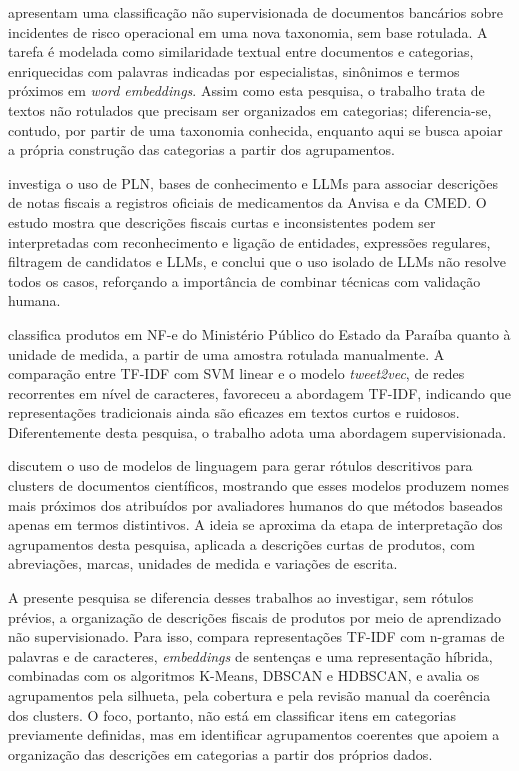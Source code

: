 \documentclass[english,brazilian]{UNISINOSmonografia}
\begin{document}
\cite{hajyahia2019unsupervised} apresentam uma classificação não supervisionada de documentos bancários sobre incidentes de risco operacional em uma nova taxonomia, sem base rotulada. A tarefa é modelada como similaridade textual entre documentos e categorias, enriquecidas com palavras indicadas por especialistas, sinônimos e termos próximos em \textit{word embeddings}. Assim como esta pesquisa, o trabalho trata de textos não rotulados que precisam ser organizados em categorias; diferencia-se, contudo, por partir de uma taxonomia conhecida, enquanto aqui se busca apoiar a própria construção das categorias a partir dos agrupamentos.

\cite{martins2025extracao} investiga o uso de PLN, bases de conhecimento e LLMs para associar descrições de notas fiscais a registros oficiais de medicamentos da Anvisa e da CMED. O estudo mostra que descrições fiscais curtas e inconsistentes podem ser interpretadas com reconhecimento e ligação de entidades, expressões regulares, filtragem de candidatos e LLMs, e conclui que o uso isolado de LLMs não resolve todos os casos, reforçando a importância de combinar técnicas com validação humana.

\cite{santos2023classificacao} classifica produtos em NF-e do Ministério Público do Estado da Paraíba quanto à unidade de medida, a partir de uma amostra rotulada manualmente. A comparação entre TF-IDF com SVM linear e o modelo \textit{tweet2vec}, de redes recorrentes em nível de caracteres, favoreceu a abordagem TF-IDF, indicando que representações tradicionais ainda são eficazes em textos curtos e ruidosos. Diferentemente desta pesquisa, o trabalho adota uma abordagem supervisionada.

\cite{murray2025using} discutem o uso de modelos de linguagem para gerar rótulos descritivos para clusters de documentos científicos, mostrando que esses modelos produzem nomes mais próximos dos atribuídos por avaliadores humanos do que métodos baseados apenas em termos distintivos. A ideia se aproxima da etapa de interpretação dos agrupamentos desta pesquisa, aplicada a descrições curtas de produtos, com abreviações, marcas, unidades de medida e variações de escrita.

A presente pesquisa se diferencia desses trabalhos ao investigar, sem rótulos prévios, a organização de descrições fiscais de produtos por meio de aprendizado não supervisionado. Para isso, compara representações TF-IDF com n-gramas de palavras e de caracteres, \textit{embeddings} de sentenças e uma representação híbrida, combinadas com os algoritmos K-Means, DBSCAN e HDBSCAN, e avalia os agrupamentos pela silhueta, pela cobertura e pela revisão manual da coerência dos clusters. O foco, portanto, não está em classificar itens em categorias previamente definidas, mas em identificar agrupamentos coerentes que apoiem a organização das descrições em categorias a partir dos próprios dados.
\end{document}
